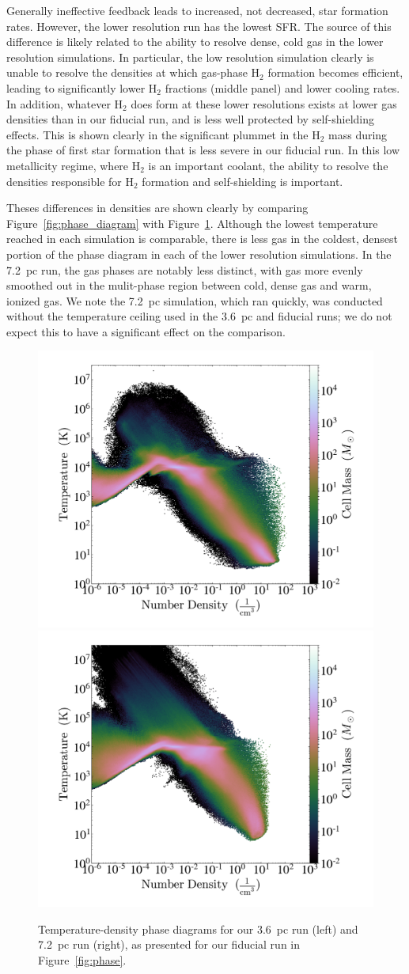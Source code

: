 \documentclass[fleqn,usenatbib,useAMS]{mnras}
\begin{document}
Generally ineffective feedback leads to increased, not decreased, star formation rates. However, the lower resolution run has the lowest SFR. The source of this difference is likely related to the ability to resolve dense, cold gas in the lower resolution simulations. In particular, the low resolution simulation clearly is unable to resolve the densities at which gas-phase H$_2$ formation becomes efficient, leading to significantly lower H$_2$ fractions (middle panel) and lower cooling rates. In addition, whatever H$_2$ does form at these lower resolutions exists at lower gas densities than in our fiducial run, and is less well protected by self-shielding effects. This is shown clearly in the significant plummet in the H$_2$ mass during the phase of first star formation that is less severe in our fiducial run. In this low metallicity regime, where H$_2$ is an important coolant, the ability to resolve the densities responsible for H$_2$ formation and self-shielding is important. 

Theses differences in densities are shown clearly by comparing Figure~\ref{fig:phase_diagram} with Figure~\ref{fig:phase_resolution}. Although the lowest temperature reached in each simulation is comparable, there is less gas in the coldest, densest portion of the phase diagram in each of the lower resolution simulations. In the 7.2~pc run, the gas phases are notably less distinct, with gas more evenly smoothed out in the mulit-phase region between cold, dense gas and warm, ionized gas. We note the 7.2~pc simulation, which ran quickly, was conducted without the temperature ceiling used in the 3.6~pc and fiducial runs; we do not expect this to have a significant effect on the comparison.


\begin{figure}
\centering
\includegraphics[width=0.475\linewidth]{3pc_phase.png}
\includegraphics[width=0.475\linewidth]{6pc_phase.png}
\caption{Temperature-density phase diagrams for our 3.6~pc run (left) and 7.2~pc run (right), as presented for our fiducial run in Figure~\ref{fig:phase}.}
\label{fig:phase_resolution}
\end{figure}
\end{document}

